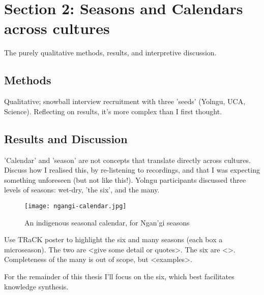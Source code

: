 \chapter{Section 2:  Seasons and Calendars across cultures}
The purely qualitative methods, results, and interpretive discussion.

\section{Methods}
Qualitative; snowball interview recruitment with three 'seeds' (Yolngu, UCA, Science).
Reflecting on results, it's more complex than I first thought.

\section{Results and Discussion}
'Calendar' and 'season' are not concepts that translate directly across cultures. 
Discuss how I realised this, by re-listening to recordings, and that I was expecting something unforeseen (but not like this!).  
Yolngu participants discussed three levels of seasons:  wet-dry, 'the six', and the many.

\begin{figure}[h]
    \centering
    \texttt{[image: ngangi-calendar.jpg]}
    \caption{An indigenous seasonal calendar, for Ngan'gi seasons \citep{CSIROcals}}
    \label{fig:ngangi-seasons}
\end{figure}

Use TRaCK poster to highlight the six and many seasons (each box a microseason).
The two are <give some detail or quotes>.
The six are <>.
Completeness of the many is out of scope, but <examples>.  

For the remainder of this thesis I'll focus on the six, which best facilitates knowledge synthesis.

